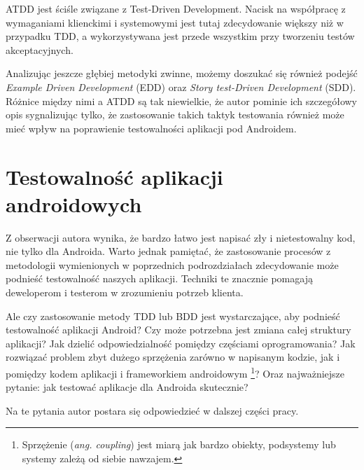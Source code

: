 ATDD jest ściśle związane z Test-Driven Development. Nacisk na współpracę z wymaganiami klienckimi i systemowymi jest tutaj zdecydowanie większy niż w przypadku TDD, a wykorzystywana jest przede wszystkim przy tworzeniu testów akceptacyjnych.

Analizując jeszcze głębiej metodyki zwinne, możemy doszukać się również podejść \textit{Example Driven Development} (EDD) oraz \textit{Story test-Driven Development} (SDD). Różnice między nimi a ATDD są tak niewielkie, że autor pominie ich szczegółowy opis sygnalizując tylko, że zastosowanie takich taktyk testowania również może mieć wpływ na poprawienie testowalności aplikacji pod Androidem.  

\section{Testowalność aplikacji androidowych}
Z obserwacji autora wynika, że bardzo łatwo jest napisać zły i nietestowalny kod, nie tylko dla Androida. Warto jednak pamiętać, że zastosowanie procesów z metodologii wymienionych w poprzednich podrozdziałach zdecydowanie może podnieść testowalność naszych aplikacji. Techniki te znacznie pomagają deweloperom i testerom w zrozumieniu potrzeb klienta.

Ale czy zastosowanie metody TDD lub BDD jest wystarczające, aby podnieść testowalność aplikacji Android? Czy może potrzebna jest zmiana całej struktury aplikacji? Jak dzielić odpowiedzialność pomiędzy częściami oprogramowania? Jak rozwiązać problem zbyt dużego sprzężenia zarówno w napisanym kodzie, jak i pomiędzy kodem aplikacji i frameworkiem androidowym \footnote{Sprzężenie (\textit{ang. coupling}) jest miarą jak bardzo obiekty, podsystemy lub systemy zależą od siebie nawzajem.}? Oraz najważniejsze pytanie: jak testować aplikacje dla Androida skutecznie?

Na te pytania autor postara się odpowiedzieć w dalszej części pracy.



